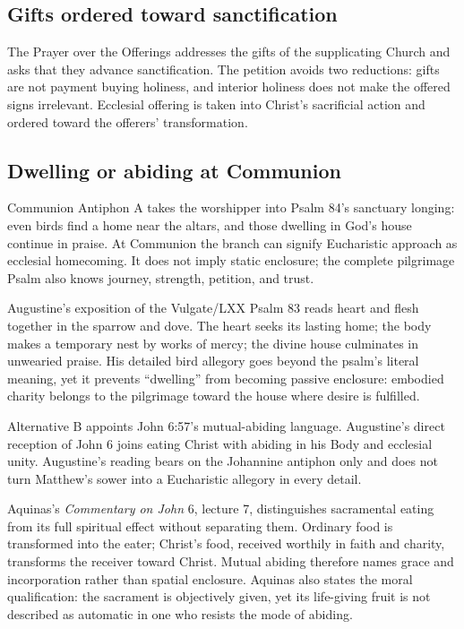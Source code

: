 \subsection*{Gifts ordered toward sanctification\enspace{}}

The Prayer over the Offerings addresses the gifts of the supplicating Church and asks that they advance sanctification. The petition avoids two reductions: gifts are not payment buying holiness, and interior holiness does not make the offered signs irrelevant. Ecclesial offering is taken into Christ's sacrificial action and ordered toward the offerers' transformation.

\subsection*{Dwelling or abiding at Communion\enspace{}}

Communion Antiphon A takes the worshipper into Psalm 84's sanctuary longing: even birds find a home near the altars, and those dwelling in God's house continue in praise. At Communion the branch can signify Eucharistic approach as ecclesial homecoming. It does not imply static enclosure; the complete pilgrimage Psalm also knows journey, strength, petition, and trust.

Augustine's exposition of the Vulgate/LXX Psalm 83 reads heart and flesh together in the sparrow and dove. The heart seeks its lasting home; the body makes a temporary nest by works of mercy; the divine house culminates in unwearied praise. His detailed bird allegory goes beyond the psalm's literal meaning, yet it prevents “dwelling” from becoming passive enclosure: embodied charity belongs to the pilgrimage toward the house where desire is fulfilled.

Alternative B appoints John 6:57's mutual-abiding language. Augustine's direct reception of John 6 joins eating Christ with abiding in his Body and ecclesial unity. Augustine's reading bears on the Johannine antiphon only and does not turn Matthew's sower into a Eucharistic allegory in every detail.

Aquinas's \emph{Commentary on John} 6, lecture 7, distinguishes sacramental eating from its full spiritual effect without separating them. Ordinary food is transformed into the eater; Christ's food, received worthily in faith and charity, transforms the receiver toward Christ. Mutual abiding therefore names grace and incorporation rather than spatial enclosure. Aquinas also states the moral qualification: the sacrament is objectively given, yet its life-giving fruit is not described as automatic in one who resists the mode of abiding.


